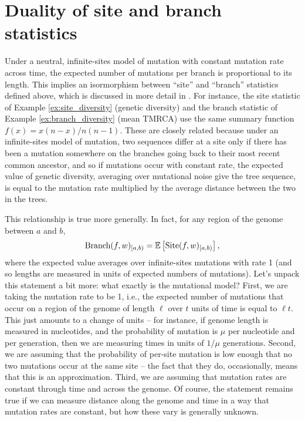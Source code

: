 \documentclass{article}
\newcommand{\branch}{\mbox{Branch}} %
\newcommand{\site}{\mbox{Site}} %
\newcommand{\iw}{w} %
\begin{document}
\section*{Duality of site and branch statistics}

Under a neutral, infinite-sites model of mutation with constant mutation rate across time,
the expected number of mutations per branch is proportional to its length.
This implies an isormorphism between ``site'' and ``branch'' statistics defined above,
which is discussed in more detail in \citet{ralph2019empirical}.
For instance, the site statistic of Example \ref{ex:site_diversity} (genetic diversity)
and the branch statistic of Example \ref{ex:branch_diversity} (mean TMRCA)
use the same summary function $f(x) = x(n-x)/n(n-1)$.
These are closely related because under an infinite-sites model of mutation,
two sequences differ at a site only if there has been a mutation somewhere on the branches going back
to their most recent common ancestor,
and so if mutations occur with constant rate,
the expected value of genetic diversity,
averaging over mutational noise give the tree sequence,
is equal to the mutation rate multiplied by the average distance between the two in the trees.

This relationship is true more generally.
In fact, for any region of the genome between $a$ and $b$,
\begin{align}
    \branch(f, \iw)_{[a,b)}
    =
    \E\left[ \site(f, \iw)_{[a,b)} \right] ,
\end{align}
where the expected value averages over infinite-sites mutations with rate 1
(and so lengths are measured in units of expected numbers of mutations).
Let's unpack this statement a bit more: what exactly is the mutational model?
First, we are taking the mutation rate to be 1, i.e.,
the expected number of mutations that occur on a region of the genome of length $\ell$
over $t$ units of time is equal to $\ell t$.
This just amounts to a change of units --
for instance, if genome length is measured in nucleotides,
and the probability of mutation is $\mu$ per nucleotide and per generation,
then we are measuring times in units of $1/\mu$ generations.
Second, we are assuming that the probability of per-site mutation is low enough
that no two mutations occur at the same site
-- the fact that they do, occasionally, means that this is an approximation.
Third, we are assuming that mutation rates are constant through time and across the genome.
Of course, the statement remains true if we can measure distance along the genome and time
in a way that mutation rates are constant, but how these vary is generally unknown.
\end{document}
